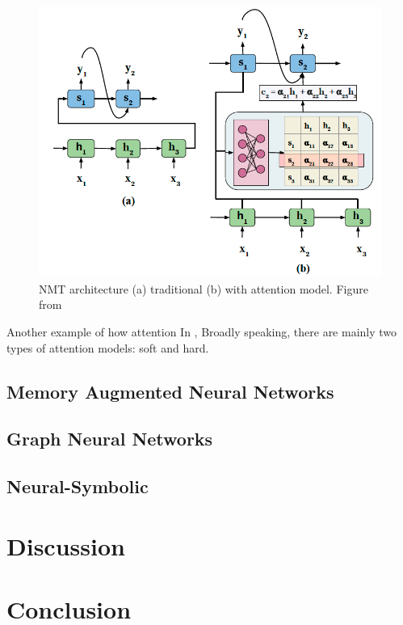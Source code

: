 \documentclass[journal]{IEEEtran}
\begin{document}
\begin{figure}[htb]
  \includegraphics[width=\linewidth]{../NMT.png}
  \caption{NMT architecture (a) traditional (b) with attention model.
  Figure from \cite{chaudhari1904attentive}}
  \label{NMT}
\end{figure}

Another example of how attention 
In \cite{xu2015show}, 
Broadly speaking, there are mainly two types of attention models: soft and hard. 

\subsection{Memory Augmented Neural Networks}

\subsection{Graph Neural Networks}

\subsection{Neural-Symbolic}

\section{Discussion}

\section{Conclusion}



\end{document}
